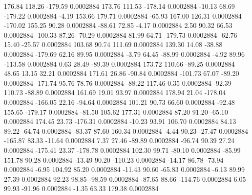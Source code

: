       176.84      118.26     -179.59     0.0002884
      173.76      111.53     -178.14     0.0002884
      -10.13       68.69     -179.22     0.0002884
       -4.19      153.66      179.71     0.0002884
      -65.93      167.00      126.31     0.0002884
     -170.02      155.25       90.28     0.0002884
      -88.61       72.85       -4.17     0.0002884
        2.50       90.32       66.53     0.0002884
     -100.33       87.26      -70.29     0.0002884
       81.99       64.71     -179.73     0.0002884
      -62.76       15.40      -25.57     0.0002884
      103.68       90.74      111.69     0.0002884
      139.30       14.08      -38.88     0.0002884
     -179.69       62.16       89.95     0.0002884
       -3.79       64.45      -88.99     0.0002884
       -4.92       89.96     -113.58     0.0002884
        0.63       28.49      -89.39     0.0002884
      173.72      110.66      -89.25     0.0002884
       48.65       13.15       32.21     0.0002884
      171.61       26.86      -90.84     0.0002884
     -101.73       67.07      -89.20     0.0002884
     -171.74       95.76       78.76     0.0002884
      -88.22      117.46        0.35     0.0002884
      -92.39      110.73      -88.89     0.0002884
      161.69       19.01       93.97     0.0002884
      178.94       21.04     -178.04     0.0002884
     -166.05       22.16      -94.64     0.0002884
      101.21       90.73       66.60     0.0002884
      -92.48      155.65     -179.17     0.0002884
      -81.50      105.62      177.31     0.0002884
       87.20       91.20      -65.10     0.0002884
      174.45       23.73     -176.31     0.0002884
      -10.23       93.91      106.70     0.0002884
       84.13       89.22      -64.74     0.0002884
      -83.37       87.60      160.34     0.0002884
       -4.44       90.23      -27.47     0.0002884
     -165.87       83.33      -11.64     0.0002884
        7.37       27.46      -89.89     0.0002884
      -96.74       90.39       27.24     0.0002884
     -175.41       23.37     -178.78     0.0002884
      102.30       99.71      -80.10     0.0002884
      -85.99      151.78       90.28     0.0002884
      -13.49       90.20     -110.23     0.0002884
      -14.17       86.78      -73.94     0.0002884
       -6.95      104.92       85.20     0.0002884
      -11.43       90.60      -65.83     0.0002884
       -6.13       89.99       27.39     0.0002884
       92.23       98.85      -98.59     0.0002884
      -87.65       88.66     -114.76     0.0002884
        6.05       99.93      -91.96     0.0002884
       -1.35       63.33      179.38     0.0002884
